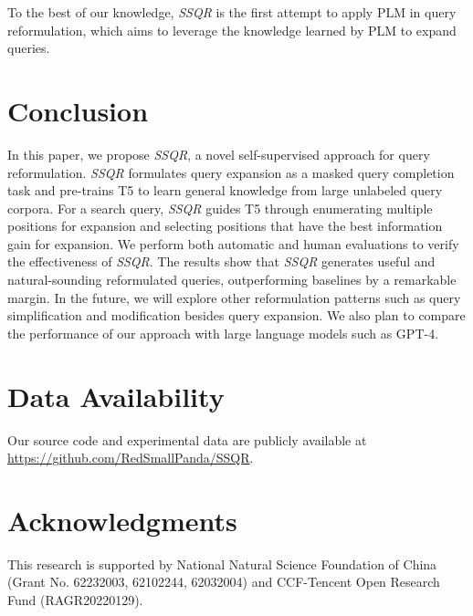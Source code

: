 \documentclass[sigconf,screen]{acmart}
\newcommand{\ourmethod}{\textit{SSQR}\xspace}
\begin{document}
To the best of our knowledge, \ourmethod is the first attempt to apply PLM in query reformulation, which aims to leverage the knowledge learned by PLM to expand queries.


\section{Conclusion}
In this paper, we propose \ourmethod, a novel self-supervised approach for query reformulation. 
\ourmethod formulates query expansion as a masked query completion task and pre-trains T5 to learn general knowledge from large unlabeled query corpora. For a search query, \ourmethod guides T5 through enumerating multiple positions for expansion and selecting positions that have the best information gain for expansion.
We perform both automatic and human evaluations to verify the effectiveness of \ourmethod. %
The results show that \ourmethod generates useful and natural-sounding reformulated queries, outperforming baselines by a remarkable margin.
In the future, we will explore other reformulation patterns such as query simplification and modification besides query expansion. 
We also plan to compare the performance of our approach with large language models such as GPT-4.

\section*{Data Availability}
Our source code and experimental data are publicly available at \href{https://github.com/RedSmallPanda/SSQR}{https://github.com/RedSmallPanda/SSQR}.

\section*{Acknowledgments}
This research is supported by National Natural Science Foundation of China (Grant No. 62232003, 62102244, 62032004) and CCF-Tencent Open Research Fund (RAGR20220129). 

\balance


\end{document}
